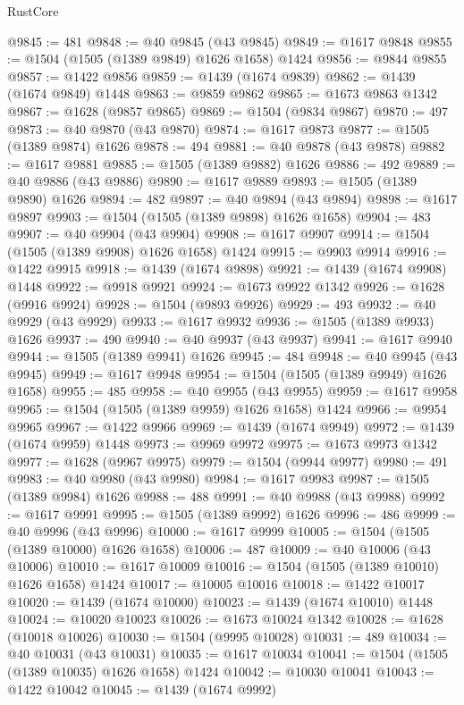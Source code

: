 \begin{lexlean}{RustCore}
\begin{coremodule}
@9845 := 481
@9848 := @40 @9845 (@43 @9845)
@9849 := @1617 @9848
@9855 := @1504 (@1505 (@1389 @9849) @1626 @1658) @1424
@9856 := @9844 @9855
@9857 := @1422 @9856
@9859 := @1439 (@1674 @9839)
@9862 := @1439 (@1674 @9849) @1448
@9863 := @9859 @9862
@9865 := @1673 @9863 @1342
@9867 := @1628 (@9857 @9865)
@9869 := @1504 (@9834 @9867)
@9870 := 497
@9873 := @40 @9870 (@43 @9870)
@9874 := @1617 @9873
@9877 := @1505 (@1389 @9874) @1626
@9878 := 494
@9881 := @40 @9878 (@43 @9878)
@9882 := @1617 @9881
@9885 := @1505 (@1389 @9882) @1626
@9886 := 492
@9889 := @40 @9886 (@43 @9886)
@9890 := @1617 @9889
@9893 := @1505 (@1389 @9890) @1626
@9894 := 482
@9897 := @40 @9894 (@43 @9894)
@9898 := @1617 @9897
@9903 := @1504 (@1505 (@1389 @9898) @1626 @1658)
@9904 := 483
@9907 := @40 @9904 (@43 @9904)
@9908 := @1617 @9907
@9914 := @1504 (@1505 (@1389 @9908) @1626 @1658) @1424
@9915 := @9903 @9914
@9916 := @1422 @9915
@9918 := @1439 (@1674 @9898)
@9921 := @1439 (@1674 @9908) @1448
@9922 := @9918 @9921
@9924 := @1673 @9922 @1342
@9926 := @1628 (@9916 @9924)
@9928 := @1504 (@9893 @9926)
@9929 := 493
@9932 := @40 @9929 (@43 @9929)
@9933 := @1617 @9932
@9936 := @1505 (@1389 @9933) @1626
@9937 := 490
@9940 := @40 @9937 (@43 @9937)
@9941 := @1617 @9940
@9944 := @1505 (@1389 @9941) @1626
@9945 := 484
@9948 := @40 @9945 (@43 @9945)
@9949 := @1617 @9948
@9954 := @1504 (@1505 (@1389 @9949) @1626 @1658)
@9955 := 485
@9958 := @40 @9955 (@43 @9955)
@9959 := @1617 @9958
@9965 := @1504 (@1505 (@1389 @9959) @1626 @1658) @1424
@9966 := @9954 @9965
@9967 := @1422 @9966
@9969 := @1439 (@1674 @9949)
@9972 := @1439 (@1674 @9959) @1448
@9973 := @9969 @9972
@9975 := @1673 @9973 @1342
@9977 := @1628 (@9967 @9975)
@9979 := @1504 (@9944 @9977)
@9980 := 491
@9983 := @40 @9980 (@43 @9980)
@9984 := @1617 @9983
@9987 := @1505 (@1389 @9984) @1626
@9988 := 488
@9991 := @40 @9988 (@43 @9988)
@9992 := @1617 @9991
@9995 := @1505 (@1389 @9992) @1626
@9996 := 486
@9999 := @40 @9996 (@43 @9996)
@10000 := @1617 @9999
@10005 := @1504 (@1505 (@1389 @10000) @1626 @1658)
@10006 := 487
@10009 := @40 @10006 (@43 @10006)
@10010 := @1617 @10009
@10016 := @1504 (@1505 (@1389 @10010) @1626 @1658) @1424
@10017 := @10005 @10016
@10018 := @1422 @10017
@10020 := @1439 (@1674 @10000)
@10023 := @1439 (@1674 @10010) @1448
@10024 := @10020 @10023
@10026 := @1673 @10024 @1342
@10028 := @1628 (@10018 @10026)
@10030 := @1504 (@9995 @10028)
@10031 := 489
@10034 := @40 @10031 (@43 @10031)
@10035 := @1617 @10034
@10041 := @1504 (@1505 (@1389 @10035) @1626 @1658) @1424
@10042 := @10030 @10041
@10043 := @1422 @10042
@10045 := @1439 (@1674 @9992)

\end{coremodule}
\end{lexlean}
